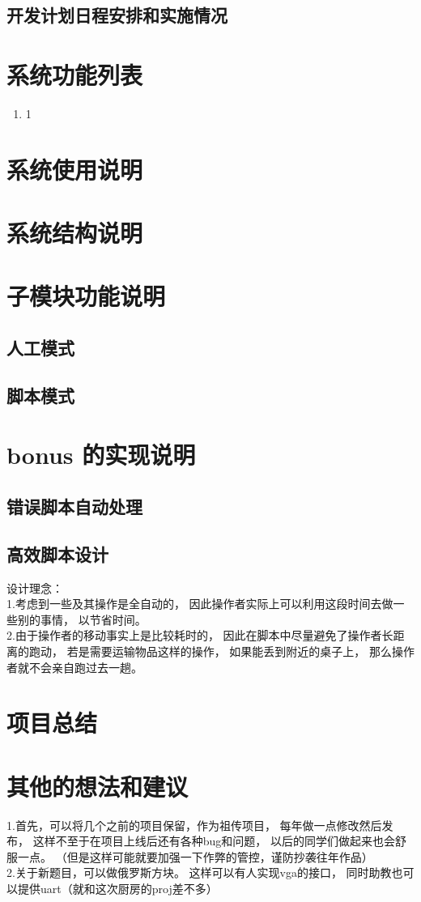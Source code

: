 \documentclass[12pt, a4paper]{ctexart}
\begin{document}
\subsection{开发计划日程安排和实施情况}

\section{系统功能列表}

\begin{enumerate}
	\item 1
\end{enumerate}

\section{系统使用说明}

\section{系统结构说明}

\section{子模块功能说明}
\subsection{人工模式}

\subsection{脚本模式}

\section{bonus 的实现说明}
\subsection{错误脚本自动处理}

\subsection{高效脚本设计}
设计理念：\\
1.考虑到一些及其操作是全自动的，
因此操作者实际上可以利用这段时间去做一些别的事情，
以节省时间。\\
2.由于操作者的移动事实上是比较耗时的，
因此在脚本中尽量避免了操作者长距离的跑动，
若是需要运输物品这样的操作，
如果能丢到附近的桌子上，
那么操作者就不会亲自跑过去一趟。

\section{项目总结}



\section{其他的想法和建议}
1.首先，可以将几个之前的项目保留，作为祖传项目，
每年做一点修改然后发布，
这样不至于在项目上线后还有各种bug和问题，
以后的同学们做起来也会舒服一点。
（但是这样可能就要加强一下作弊的管控，谨防抄袭往年作品）\\
2.关于新题目，可以做俄罗斯方块。
这样可以有人实现vga的接口，
同时助教也可以提供uart（就和这次厨房的proj差不多）\\
\end{document}
